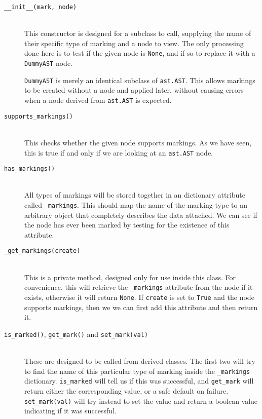 \documentclass[twoside,a4paper]{report}
\begin{document}
\begin{description}
\item[\texttt{\_\_init\_\_(mark, node)}] \hfill \\
This constructor is designed for a subclass to call, supplying the name of their specific type of marking and a node to view. The only
processing done here is to test if the given node is \texttt{None}, and if so to replace it with a \texttt{DummyAST} node.

\texttt{DummyAST} is merely an identical subclass of \texttt{ast.AST}. This allows markings to be created without a node and applied later,
without causing errors when a node derived from \texttt{ast.AST} is expected.

\item[\texttt{supports\_markings()}] \hfill \\
This checks whether the given node supports markings. As we have seen, this is true if and only if we are looking at an \texttt{ast.AST}
node.

\item[\texttt{has\_markings()}] \hfill \\
All types of markings will be stored together in an dictionary attribute called \texttt{\_markings}. This should map the name of the marking
type to an arbitrary object that completely describes the data attached. We can see if the node has ever been marked by testing for the
existence of this attribute.

\item[\texttt{\_get\_markings(create)}] \hfill \\
This is a private method, designed only for use inside this class. For convenience, this will retrieve the \texttt{\_markings} attribute
from the node if it exists, otherwise it will return \texttt{None}. If \texttt{create} is set to \texttt{True} and the node supports
markings, then we we can first add this attribute and then return it.

\item[\texttt{is\_marked()}, \texttt{get\_mark()} and \texttt{set\_mark(val)}] \hfill \\
These are designed to be called from derived classes. The first two will try to find the name of this particular type of marking inside
the \texttt{\_markings} dictionary. \texttt{is\_marked} will tell us if this was successful, and \texttt{get\_mark} will return either the
corresponding value, or a safe default on failure. \texttt{set\_mark(val)} will try instead to set the value and return a boolean value
indicating if it was successful.


\end{description}
\end{document}
